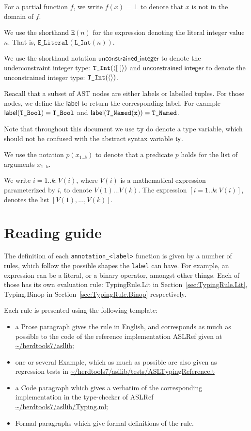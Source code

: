 \documentclass{book}
\newcommand\astlabel[0]{\textsf{label}}
\newcommand\underconstrainedinteger[0]{\textsf{unconstrained\_integer}}
\newcommand\unconstrainedinteger[0]{\textsf{unconstrained\_integer}}
\newcommand\tty[0]{\texttt{ty}}
\begin{document}
For a partial function $f$, we write $f(x) = \bot$ to denote that $x$ is not in the domain of $f$.

\newcommand\Elit[1]{\texttt{E}(#1)}
We use the shorthand $\Elit{n}$ for the expression denoting the literal integer value $n$. That is, $\texttt{E\_Literal}(\texttt{L\_Int}(n))$.

We use the shorthand notation $\underconstrainedinteger$ to denote the underconstraint integer type: $\texttt{T\_Int}(\langle[\ ]\rangle)$
and $\unconstrainedinteger$ to denote the unconstrained integer type: $\texttt{T\_Int}(\langle\rangle)$.

Reacall that a subset of AST nodes are either labels or labelled tuples.
For those nodes, we define the $\astlabel$ to return the corresponding label.
For example $\astlabel(\TBool) = \TBool$ and $\astlabel(\TNamed(\texttt{x})) = \TNamed$.

Note that throughout this document we use $\tty$ do denote a type variable, which should not be confused with the abstract syntax variable $\textsf{ty}$.

We use the notation $p(x_{1..k})$ to denote that a predicate $p$ holds for the list of arguments $x_{1..k}$.

We write $i=1..k: V(i)$, where $V(i)$ is a mathematical expression parameterized by $i$, to denote $V(1) \ldots V(k)$.
The expression $[i=1..k: V(i)]$, denotes the list $[V(1),\ldots,V(k)]$.

\chapter{Reading guide}

The definition of each \texttt{annotation\_<label>} function is given by a number of
rules, which follow the possible shapes the \texttt{label} can have. For
example, an expression can be a literal, or a binary operator, amongst other
things. Each of those has its own evaluation rule: TypingRule.Lit in
Section~\ref{sec:TypingRule.Lit}, Typing.Binop in
Section~\ref{sec:TypingRule.Binop} respectively.

Each rule is presented using the following template:
\begin{itemize}
\item a Prose paragraph gives the rule in English, and corresponds as much as possible to the code of the reference implementation ASLRef given at \url{~/herdtools7/asllib};
\item one or several Example, which as much as possible are also given as regression tests in \url{~/herdtools7/asllib/tests/ASLTypingReference.t}
\item a Code paragraph which gives a verbatim of the corresponding implementation in the type-checker of ASLRef \url{~/herdtools7/asllib/Typing.ml};
\item Formal paragraphs which give formal definitions of the rule.
\end{itemize}
\end{document}
